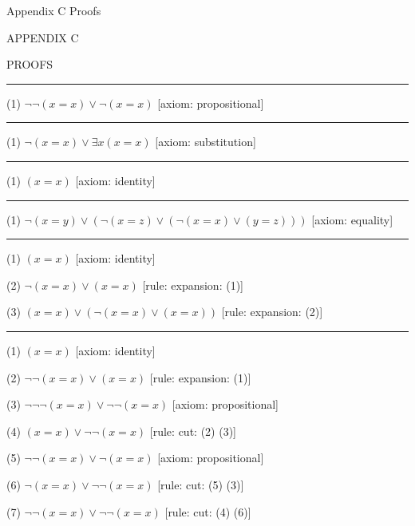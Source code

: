  {Appendix C Proofs}
\centerline{\xmplbxi APPENDIX C}
\medskip
\centerline{\xmplbx PROOFS}
\bigskip

\medskip
\hrule
\medskip
\item{(1)} $\neg \neg (x = x) \lor \neg (x = x)$ \hfill [axiom: propositional]
\medskip
\hrule
\medskip
\item{(1)} $\neg (x = x) \lor \exists x (x = x)$ \hfill [axiom: substitution]
\medskip
\hrule
\medskip
\item{(1)} $(x = x)$ \hfill [axiom: identity]
\medskip
\hrule
\medskip
\item{(1)} $\neg (x = y) \lor (\neg (x = z) \lor (\neg (x = x) \lor (y = z)))$ \hfill [axiom: equality]
\medskip
\hrule
\medskip
\item{(1)} $(x = x)$ \hfill [axiom: identity]
\item{(2)} $\neg (x = x) \lor (x = x)$ \hfill [rule: expansion: (1)]
\item{(3)} $(x = x) \lor (\neg (x = x) \lor (x = x))$ \hfill [rule: expansion: (2)]
\medskip
\hrule
\medskip
\item{(1)} $(x = x)$ \hfill [axiom: identity]
\item{(2)} $\neg \neg (x = x) \lor (x = x)$ \hfill [rule: expansion: (1)]
\item{(3)} $\neg \neg \neg (x = x) \lor \neg \neg (x = x)$ \hfill [axiom: propositional]
\item{(4)} $(x = x) \lor \neg \neg (x = x)$ \hfill [rule: cut: (2) (3)]
\item{(5)} $\neg \neg (x = x) \lor \neg (x = x)$ \hfill [axiom: propositional]
\item{(6)} $\neg (x = x) \lor \neg \neg (x = x)$ \hfill [rule: cut: (5) (3)]
\item{(7)} $\neg \neg (x = x) \lor \neg \neg (x = x)$ \hfill [rule: cut: (4) (6)]
